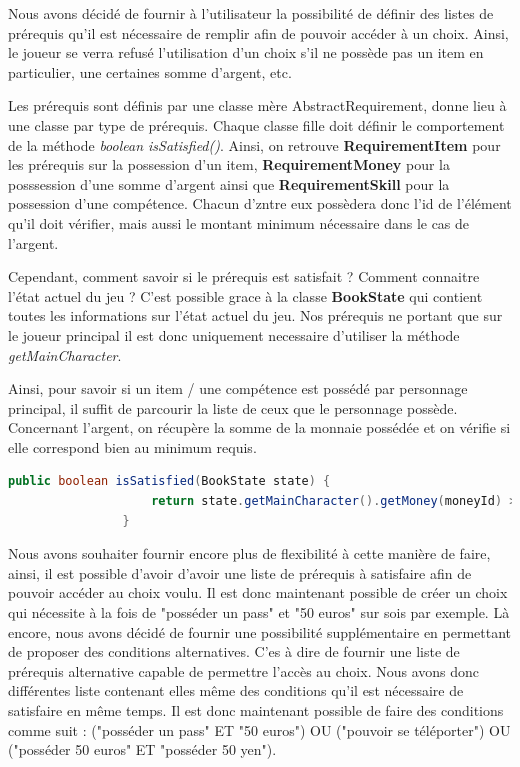 			Nous avons décidé de fournir à l'utilisateur la possibilité de définir des listes de prérequis qu'il est nécessaire de remplir afin de pouvoir accéder à un choix. Ainsi, le joueur se verra refusé l'utilisation d'un choix s'il ne possède pas un item en particulier, une certaines somme d'argent, etc.

			Les prérequis sont définis par une classe mère AbstractRequirement, donne lieu à une classe par type de prérequis. Chaque classe fille doit définir le comportement de la méthode \textit{boolean isSatisfied()}. Ainsi, on retrouve \textbf{RequirementItem} pour les prérequis sur la possession d'un item, \textbf{RequirementMoney} pour la posssession d'une somme d'argent ainsi que \textbf{RequirementSkill} pour la possession d'une compétence. Chacun d'zntre eux possèdera donc l'id de l'élément qu'il doit vérifier, mais aussi le montant minimum nécessaire dans le cas de l'argent.

			Cependant, comment savoir si le prérequis est satisfait ? Comment connaitre l'état actuel du jeu ? C'est possible grace à la classe \textbf{BookState} qui contient toutes les informations sur l'état actuel du jeu. Nos prérequis ne portant que sur le joueur principal il est donc uniquement necessaire d'utiliser la méthode \textit{getMainCharacter}.

			Ainsi, pour savoir si un item / une compétence est possédé par personnage principal, il suffit de parcourir la liste de ceux que le personnage possède. Concernant l'argent, on récupère la somme de la monnaie possédée et on vérifie si elle correspond bien au minimum requis.

			\begin{lstlisting}[gobble=16, language=java, caption=RequirementMoney.isSatisfied(), label=lst:isSatisfied]
				public boolean isSatisfied(BookState state) {
					return state.getMainCharacter().getMoney(moneyId) >= amount;
				}
			\end{lstlisting}

			Nous avons souhaiter fournir encore plus de flexibilité à cette manière de faire, ainsi, il est possible d'avoir d'avoir une liste de prérequis à satisfaire afin de pouvoir accéder au choix voulu. Il est donc maintenant possible de créer un choix qui nécessite à la fois de "posséder un pass" et "50 euros" sur sois par exemple. Là encore, nous avons décidé de fournir une possibilité supplémentaire en permettant de proposer des conditions alternatives. C'es à dire de fournir une liste de prérequis alternative capable de permettre l'accès au choix. Nous avons donc différentes liste contenant elles même des conditions qu'il est nécessaire de satisfaire en même temps. Il est donc maintenant possible de faire des conditions comme suit : ("posséder un pass" ET "50 euros") OU ("pouvoir se téléporter") OU ("posséder 50 euros" ET "posséder 50 yen").

